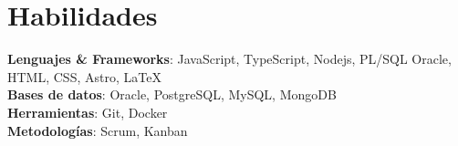 \documentclass[letterpaper,11pt]{article}
\makeatletter
\newcommand{\resumeItem}[1]{
  \item\small{
    #1 
  }
}
\newcommand{\resumeSubheading}[2]{
  \vspace{-1pt}\item
    \begin{tabular*}{1.0\textwidth}[t]{l@{\extracolsep{\fill}}r}
      \textbf{#1} & \textbf{\small #2} \\
    \end{tabular*}
}
\newcommand{\resumeSubHeadingListStart}{\begin{itemize}[leftmargin=0.0in, label={}]}
\newcommand{\resumeSubHeadingListEnd}{\end{itemize}}
\newcommand{\resumeItemListStart}{\begin{itemize}[leftmargin=3em]}
\newcommand{\resumeItemListEnd}{\end{itemize}\vspace{1pt}}
\makeatother
\begin{document}
\section{Habilidades}
 \begin{itemize}[leftmargin=0in,  label={}] %
    \small{
      \item{
        \textbf{Lenguajes \& Frameworks}{: JavaScript, TypeScript, Nodejs, PL/SQL Oracle,  HTML, CSS, Astro, \LaTeX} \\
        \textbf{Bases de datos}{: Oracle, PostgreSQL, MySQL, MongoDB} \\
        \textbf{Herramientas}{: Git, Docker} \\
        \textbf{Metodologías}{: Scrum, Kanban} \\
      }
     }
 \end{itemize}
 \vspace{-16pt}

\begin{comment}
\section{Leadership / Extracurricular}
    \resumeSubHeadingListStart
        \resumeSubheading{Fraternity}{Spring 2020 -- Present}{President}{University Name}
            \resumeItemListStart
                \resumeItem{Achieved a 4 star fraternity ranking by the Office of Fraternity and Sorority Affairs (highest possible ranking).}
                \resumeItem{Managed executive board of 5 members and ran weekly meetings to oversee progress in essential parts of the chapter.}
                \resumeItem{Led chapter of 30+ members to work towards goals that improve and promote community service, academics, and unity.}
            \resumeItemListEnd
        
    \resumeSubHeadingListEnd
 \end{comment}
\end{document}
